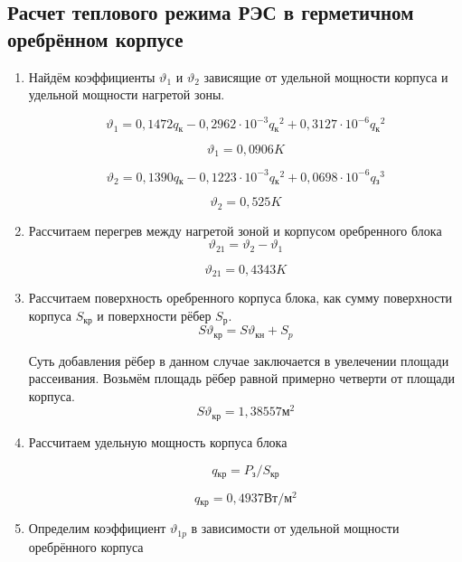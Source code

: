 \subsection{Расчет теплового режима РЭС в герметичном оребрённом корпусе}
\begin{enumerate}[label={\arabic*.}]
\item Найдём коэффициенты
$\vartheta_1$ и $\vartheta_2$ зависящие
от удельной мощности корпуса и удельной мощности нагретой зоны.

\begin{equation}
\vartheta_1 = 0,1472q\mathrm{_к} - 0,2962 \cdot 10^{-3}q\mathrm{_к}^2 + 0,3127 \cdot 10^{-6}q\mathrm{_к}^2
\end{equation}

$$\vartheta_1=0,0906K$$

\begin{equation}
\vartheta_2 = 0,1390q\mathrm{_к} - 0,1223 \cdot 10^{-3}q\mathrm{_к}^2 + 0,0698 \cdot 10^{-6}q\mathrm{_з}^3
\end{equation}

$$\vartheta_2 = 0,525K$$

\item Рассчитаем перегрев между нагретой зоной и корпусом оребренного
блока
\begin{equation}
  \vartheta_{21} = \vartheta{_2} - \vartheta{_1}
  \end{equation}

  $$\vartheta_{21} = 0,4343K$$

\item Рассчитаем поверхность оребренного корпуса блока,
  как сумму поверхности корпуса $S\mathrm{_{кр}}$
  и поверхности рёбер $S_{р}$.
  \begin{equation}
    S\vartheta{_{кр}} = S\vartheta{_{кн}} + S_{p}
  \end{equation}
  
  Суть добавления рёбер в данном случае заключается в увелечении площади
рассеивания. Возьмём площадь рёбер равной примерно четверти от площади
корпуса.
$$S\vartheta{_{кр}} = 1,38557\mathrm{м^2}$$
\item Рассчитаем удельную мощность корпуса блока
  
\begin{equation}
  q\mathrm{_{кр}} = P\mathrm{_{з}} / S\mathrm{_{кр}}
  \end{equation}

  $$q\mathrm{_{кр}} = 0,4937 \mathrm{Вт/м^2}$$
  
  \item Определим коэффициент $\vartheta_{1p}$ в зависимости от удельной
    мощности оребрённого корпуса


\end{enumerate}
